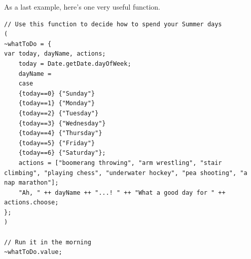 As a last example, here's one very useful function.

 
\begin{lstlisting}[style=SuperCollider-IDE, basicstyle=\scttfamily\footnotesize]
// Use this function to decide how to spend your Summer days
(
~whatToDo = { 
var today, dayName, actions;
	today = Date.getDate.dayOfWeek;
	dayName = 
	case
	{today==0} {"Sunday"}
	{today==1} {"Monday"}
	{today==2} {"Tuesday"}
	{today==3} {"Wednesday"}
	{today==4} {"Thursday"}
	{today==5} {"Friday"}
	{today==6} {"Saturday"};
	actions = ["boomerang throwing", "arm wrestling", "stair climbing", "playing chess", "underwater hockey", "pea shooting", "a nap marathon"];
	"Ah, " ++ dayName ++ "...! " ++ "What a good day for " ++ actions.choose;
};
)

// Run it in the morning
~whatToDo.value;
\end{lstlisting}

\bigskip
{} 